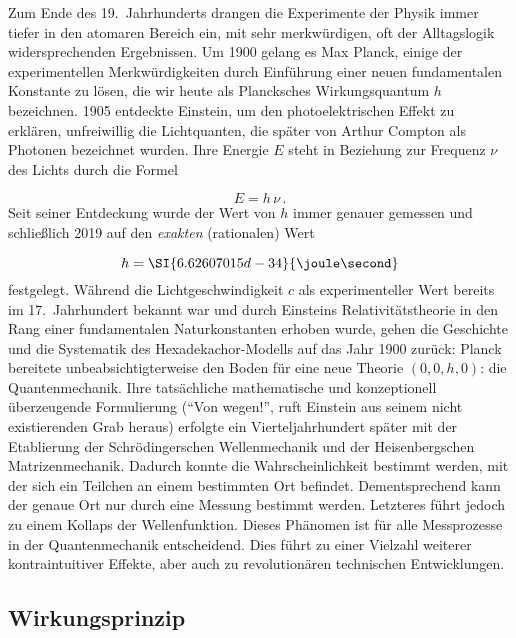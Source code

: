 \documentclass{scrartcl}
\begin{document}
\newpage {}
\label{sec:0010}

Zum Ende des 19.\ Jahrhunderts drangen die Experimente der Physik immer tiefer in den atomaren Bereich ein, mit sehr merkwürdigen, oft der Alltagslogik widersprechenden Ergebnissen. Um 1900 gelang es Max Planck, einige der experimentellen Merkwürdigkeiten durch Einführung einer neuen fundamentalen Konstante zu lösen, die wir heute als Plancksches Wirkungsquantum $h$ bezeichnen. 1905 entdeckte Einstein, um den photoelektrischen Effekt zu erklären, unfreiwillig die Lichtquanten, die später von Arthur Compton als Photonen bezeichnet wurden. Ihre Energie $E$ steht in Beziehung zur Frequenz $\nu$ des Lichts durch die Formel

\begin{equation*}
  E=h\,\nu\,.
\end{equation*}
%
Seit seiner Entdeckung wurde der Wert von $h$ immer genauer gemessen und schließlich 2019 auf den \emph{exakten} (rationalen) Wert  

\begin{equation*}
  h=\SI{6.62607015d-34}{\joule\second}
\end{equation*}
%
festgelegt. Während die Lichtgeschwindigkeit $c$ als experimenteller Wert bereits im 17.\ Jahrhundert bekannt war und durch Einsteins Relativitätstheorie in den Rang einer fundamentalen Naturkonstanten erhoben wurde, gehen die Geschichte und die Systematik des Hexadekachor-Modells auf das Jahr 1900 zurück: Planck bereitete unbeabsichtigterweise den Boden für eine neue Theorie $(0,0,h,0)$: die Quantenmechanik. Ihre tatsächliche mathematische und konzeptionell überzeugende Formulierung (\enquote{Von wegen!}, ruft Einstein aus seinem nicht existierenden Grab heraus) erfolgte ein Vierteljahrhundert später mit der Etablierung der Schrödingerschen Wellenmechanik und der Heisenbergschen Matrizenmechanik. Dadurch konnte die Wahrscheinlichkeit bestimmt werden, mit der sich ein Teilchen an einem bestimmten Ort befindet. Dementsprechend kann der genaue Ort nur durch eine Messung bestimmt werden. Letzteres führt jedoch zu einem Kollaps der Wellenfunktion. Dieses Phänomen ist für alle Messprozesse in der Quantenmechanik entscheidend. Dies führt zu einer Vielzahl weiterer kontraintuitiver Effekte, aber auch zu revolutionären technischen Entwicklungen.


\subsection*{Wirkungsprinzip}
\end{document}
